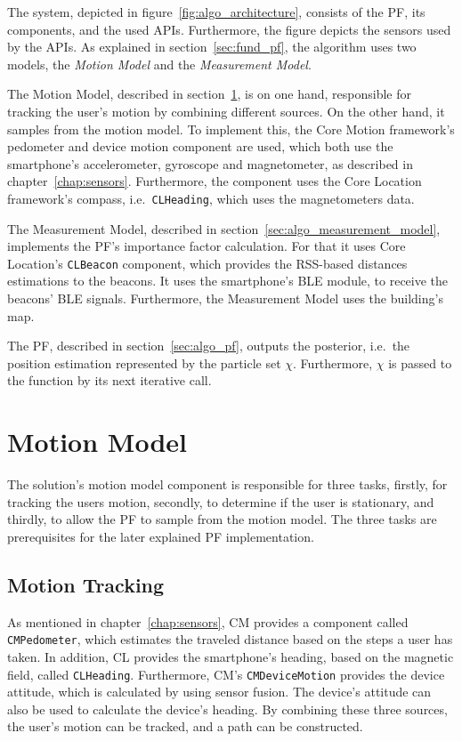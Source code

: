 The system, depicted in figure~\ref{fig:algo_architecture}, consists of the \ac{PF}, its components, and the used \acsp{API}. Furthermore, the figure depicts the sensors used by the \acsp{API}. As explained in section~\ref{sec:fund_pf}, the algorithm uses two models, the \emph{Motion Model} and the \emph{Measurement Model}.

The Motion Model, described in section~\ref{sec:algo_motion_model}, is on one hand, responsible for tracking the user's motion by combining different sources. On the other hand, it samples from the motion model. To implement this, the Core Motion framework's pedometer and device motion component are used, which both use the smartphone's accelerometer, gyroscope and magnetometer, as described in chapter~\ref{chap:sensors}. Furthermore, the component uses the Core Location framework's compass, i.e.\ \texttt{CLHeading}, which uses the magnetometers data.

The Measurement Model, described in section~\ref{sec:algo_measurement_model}, implements the \acs{PF}'s importance factor calculation. For that it uses Core Location's \texttt{CLBeacon} component, which provides the \acs{RSS}-based distances estimations to the beacons. It uses the smartphone's \acf{BLE} module, to receive the beacons' \ac{BLE} signals. Furthermore, the Measurement Model uses the building's map.

The \acl{PF}, described in section~\ref{sec:algo_pf}, outputs the posterior, i.e.\ the position estimation represented by the particle set $\chi$. Furthermore, $\chi$ is passed to the function by its next iterative call.


\section{Motion Model}\label{sec:algo_motion_model}
The solution's motion model component is responsible for three tasks, firstly, for tracking the users motion, secondly, to determine if the user is stationary, and thirdly, to allow the \acs{PF} to sample from the motion model. The three tasks are prerequisites for the later explained \acs{PF} implementation.

\subsection{Motion Tracking}
As mentioned in chapter~\ref{chap:sensors}, \acl{CM} provides a component called \texttt{CMPedometer}, which estimates the traveled distance based on the steps a user has taken. In addition, \acl{CL} provides the smartphone's heading, based on the magnetic field, called \texttt{CLHeading}. Furthermore, \ac{CM}'s \texttt{CMDeviceMotion} provides the device attitude, which is calculated by using sensor fusion. The device's attitude can also be used to calculate the device's heading. By combining these three sources, the user's motion can be tracked, and a path can be constructed.

